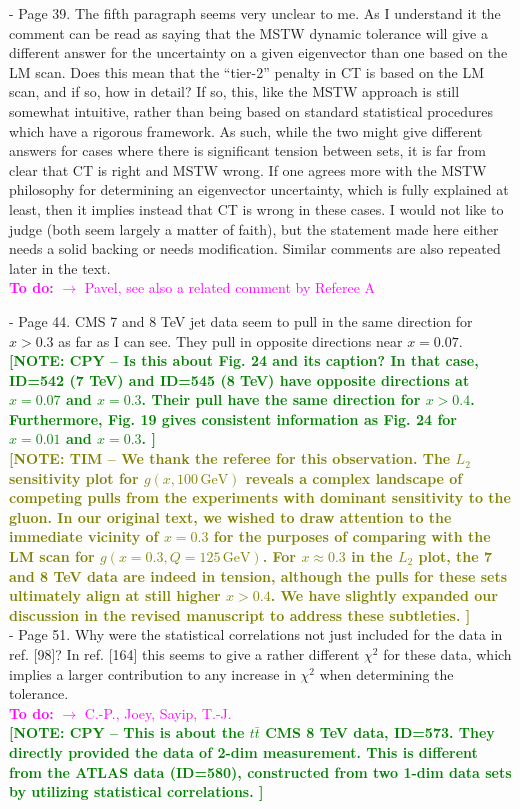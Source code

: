 \documentclass[aps,prd,amsmath,nofootinbib,floatfix,fleqn]{revtex4}
\newcommand{\TODO}[1]{\textcolor{magenta}{
\quad\vspace{3pt} \\ {\bf To do:} #1 \\
}}
\newcommand{\NOTECPY}[1]{\textcolor{green}{ \bf[NOTE: CPY -- #1 ]}}
\newcommand{\NOTETIM}[1]{\textcolor{olive}{ \bf[NOTE: TIM -- #1 ]}}
\begin{document}
- Page 39. The fifth paragraph seems very unclear to me. As I understand it the
comment can be read as saying that the MSTW dynamic tolerance will give a
different answer for the uncertainty on a given eigenvector than one based on
the LM scan. Does this mean that the ``tier-2'' penalty in CT is based on the LM
scan, and if so, how in detail? If so, this, like the MSTW approach is still
somewhat intuitive, rather than being based on standard statistical procedures
which have a rigorous framework. As such, while the two might give different
answers for cases where there is significant tension between sets, it is far
from clear that CT is right and MSTW wrong. If one agrees more with the MSTW
philosophy for determining an eigenvector uncertainty, which is fully explained
at least, then it implies instead that CT is wrong in these cases. I would not
like to judge (both seem largely a matter of faith), but the statement made here
either needs a solid backing or needs modification. Similar comments are also
repeated later in the text.
\TODO{$\to$ Pavel, see also a related comment by Referee A}

- Page 44. CMS 7 and 8 TeV jet data seem to pull in the same direction for
$x>0.3$ as far as I can see. They pull in opposite directions near $x=0.07$.\\
\NOTECPY{Is this about Fig. 24 and its caption? In that case, ID=542  (7 TeV) and ID=545 (8 TeV) have opposite directions at $x=0.07$ and $x=0.3$.  Their pull have the same direction for $x>0.4$.  Furthermore, Fig. 19 gives consistent information as Fig. 24 for $x=0.01$ and $x=0.3$.}\\
%
\NOTETIM{We thank the referee for this observation. The $L_2$ sensitivity plot for $g(x,100\, \mathrm{GeV})$ reveals a complex landscape of competing pulls from the experiments with
dominant sensitivity to the gluon. In our original text, we wished to draw attention
to the immediate vicinity of $x=0.3$ for the purposes of comparing with the LM scan
for $g(x=0.3, Q=125\, \mathrm{GeV})$. For $x \approx 0.3$ in the $L_2$ plot, the 7 and 8
TeV data are indeed in tension, although the pulls for these sets ultimately
align at still higher $x > 0.4$. We have slightly expanded our discussion in the
revised manuscript to address these subtleties.}\\



- Page 51. Why were the statistical correlations not just included for the data in ref. [98]? In ref. [164] this seems to give a rather different $\chi^2$ for these data, which implies a larger contribution to any increase in $\chi^2$ when determining the tolerance.
\TODO{$\to$ C.-P., Joey, Sayip, T.-J.}
\NOTECPY{This is about the $t \bar t$ CMS 8 TeV data, ID=573. They directly provided the data of 2-dim measurement. This is different from the ATLAS data (ID=580), constructed from two 1-dim data sets by utilizing statistical correlations.}\\
\end{document}
